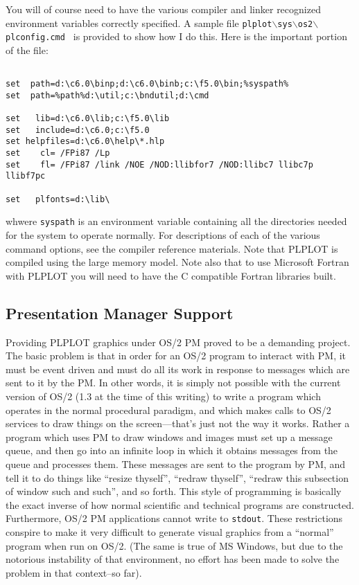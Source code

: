 You will of course need to have the various compiler and linker recognized
environment variables correctly specified.  A sample file 
{\tt plplot$\backslash$sys$\backslash$os2$\backslash$plconfig.cmd } is 
provided to show how I do this.  Here 
is the important portion of the file:
\begin{verbatim} 

set	 path=d:\c6.0\binp;d:\c6.0\binb;c:\f5.0\bin;%syspath%
set	 path=%path%d:\util;c:\bndutil;d:\cmd

set	  lib=d:\c6.0\lib;c:\f5.0\lib
set   include=d:\c6.0;c:\f5.0
set helpfiles=d:\c6.0\help\*.hlp
set	   cl= /FPi87 /Lp
set	   fl= /FPi87 /link /NOE /NOD:llibfor7 /NOD:llibc7 llibc7p llibf7pc

set   plfonts=d:\lib\

\end{verbatim}
whwere {\tt syspath} is an environment variable containing all the directories
needed for the system to operate normally.
For descriptions of each of the various command options, see the compiler
reference materials.  Note that PLPLOT is compiled using the large memory 
model.  Note also that to use Microsoft Fortran with PLPLOT you 
will need to have the C compatible Fortran libraries built.

\subsection{Presentation Manager Support}

Providing PLPLOT graphics under OS/2 PM proved to be a demanding project.
The basic problem is that in order for an OS/2 program to interact with
PM, it must be event driven and must do all its work in response to messages
which are sent to it by the PM.  In other words, it is simply not possible
with the current version of OS/2 (1.3 at the time of this writing) to 
write a program which operates in the normal procedural paradigm, and which
makes calls to OS/2 services to draw things on the screen---that's just
not the way it works.  Rather a program which uses PM to draw windows and 
images must set up a message queue, and then go into an infinite loop
in which it obtains messages from the queue and processes them.  These
messages are sent to the program by PM, and tell it to do things like ``resize
thyself'',  ``redraw thyself'', ``redraw this subsection of window such
and such'', and so forth.  This style
of programming is basically the exact inverse of how normal scientific and
technical programs are constructed.  Furthermore, OS/2 PM applications 
cannot write to {\tt stdout}.  These restrictions conspire to make it
very difficult to generate visual graphics from a ``normal'' program when
run on OS/2.  (The same is true of MS Windows, but due to the notorious
instability of that environment, no effort has been made to solve the
problem in that context--so far).

